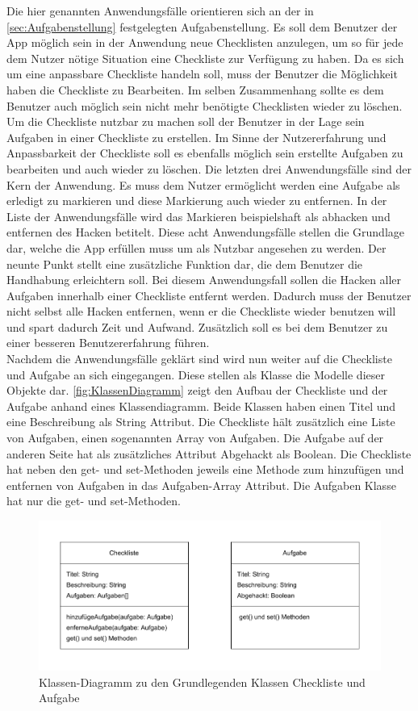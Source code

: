Die hier genannten Anwendungsfälle orientieren sich an der in \autoref{sec:Aufgabenstellung} festgelegten Aufgabenstellung.
Es soll dem Benutzer der App möglich sein in der Anwendung neue Checklisten anzulegen, um so für jede dem Nutzer nötige Situation eine Checkliste zur Verfügung zu haben. Da es sich um eine anpassbare Checkliste handeln soll, muss der Benutzer die Möglichkeit haben die Checkliste zu Bearbeiten. Im selben Zusammenhang sollte es dem Benutzer auch möglich sein nicht mehr benötigte Checklisten wieder zu löschen. Um die Checkliste nutzbar zu machen soll der Benutzer in der Lage sein Aufgaben in einer Checkliste zu erstellen. Im Sinne der Nutzererfahrung und Anpassbarkeit der Checkliste soll es ebenfalls möglich sein erstellte Aufgaben zu bearbeiten und auch wieder zu löschen. Die letzten drei Anwendungsfälle sind der Kern der Anwendung. Es muss dem Nutzer ermöglicht werden eine Aufgabe als erledigt zu markieren und diese Markierung auch wieder zu entfernen. In der Liste der Anwendungsfälle wird das Markieren beispielshaft als abhacken und entfernen des Hacken betitelt. Diese acht Anwendungsfälle stellen die Grundlage dar, welche die App erfüllen muss um als Nutzbar angesehen zu werden. Der neunte Punkt stellt eine zusätzliche Funktion dar, die dem Benutzer die Handhabung erleichtern soll. Bei diesem Anwendungsfall sollen die \glqq Hacken\grqq{} aller Aufgaben innerhalb einer Checkliste entfernt werden. Dadurch muss der Benutzer nicht selbst alle Hacken entfernen, wenn er die Checkliste wieder benutzen will und spart dadurch Zeit und Aufwand. Zusätzlich soll es bei dem Benutzer zu einer besseren Benutzererfahrung führen.\\
Nachdem die Anwendungsfälle geklärt sind wird nun weiter auf die Checkliste und Aufgabe an sich eingegangen. Diese stellen als Klasse die Modelle dieser Objekte dar. \autoref{fig:KlassenDiagramm} zeigt den Aufbau der Checkliste und der Aufgabe anhand eines Klassendiagramm. Beide Klassen haben einen Titel und eine Beschreibung als String Attribut. Die Checkliste hält zusätzlich eine Liste von Aufgaben, einen sogenannten Array von Aufgaben. Die Aufgabe auf der anderen Seite hat als zusätzliches Attribut Abgehackt als Boolean. Die Checkliste hat neben den get- und set-Methoden jeweils eine Methode zum hinzufügen und entfernen von Aufgaben in das Aufgaben-Array Attribut. Die Aufgaben Klasse hat nur die get- und set-Methoden. 

\begin{figure}[h]
	\centering
	\includegraphics{Bilder/KlassenDiagramm.pdf} 
	\caption{Klassen-Diagramm zu den Grundlegenden Klassen Checkliste und Aufgabe}
	\label{fig:KlassenDiagramm}
\end{figure}

